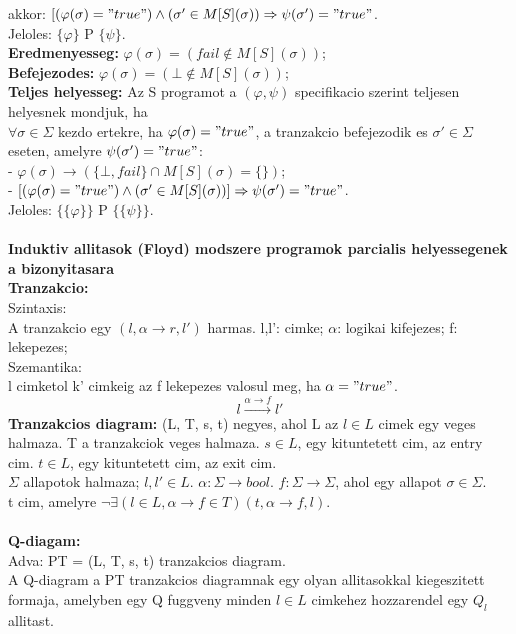 \documentclass[a4paper,10pt]{article}
\begin{document}
akkor: $[(\varphi(\sigma) = "true" ) \wedge (\sigma'\in M[S](\sigma)) \Rightarrow \psi(\sigma') = "true"$.\\
Jeloles: $\lbrace\varphi\rbrace$ P $\lbrace\psi\rbrace$.\\
\textbf{Eredmenyesseg:} $\varphi(\sigma) = (fail\not\in M[S](\sigma))$;\\
\textbf{Befejezodes:} $\varphi(\sigma) = (\bot\not\in M[S](\sigma))$;\\
\textbf{Teljes helyesseg:} Az S programot a $(\varphi, \psi)$ specifikacio szerint teljesen helyesnek mondjuk, ha\\
$\forall \sigma \in \Sigma$ kezdo ertekre, ha $\varphi(\sigma) = "true"$, a tranzakcio befejezodik es $\sigma'\in \Sigma$ eseten, amelyre $\psi(\sigma')="true"$:\\
- $\varphi(\sigma) \rightarrow (\lbrace\bot, fail\rbrace \cap M[S](\sigma)=\lbrace\rbrace)$;\\
- $[(\varphi(\sigma)="true")\wedge(\sigma'\in M[S](\sigma))] \Rightarrow \psi(\sigma') = "true"$.\\
Jeloles: $\lbrace\lbrace\varphi\rbrace\rbrace$ P $\lbrace\lbrace\psi\rbrace\rbrace$.\\\\
\textbf{Induktiv allitasok (Floyd) modszere programok parcialis helyessegenek a bizonyitasara}\\
\textbf{Tranzakcio:}\\
Szintaxis:\\
A tranzakcio egy $(l, \alpha\to r, l')$ harmas. l,l': cimke; $\alpha$: logikai kifejezes; f: lekepezes;\\
Szemantika:\\
l cimketol k' cimkeig az f lekepezes valosul meg, ha $\alpha="true"$.
$$l\xrightarrow{\alpha\to f}l'$$
\textbf{Tranzakcios diagram:} (L, T, s, t) negyes, ahol L az $l\in L$ cimek egy veges halmaza. T a tranzakciok veges halmaza. $s\in L$, egy kituntetett cim, az entry cim. $t\in L$, egy kituntetett cim, az exit cim.\\
$\Sigma$ allapotok halmaza; $l, l' \in L$. $\alpha: \Sigma \to bool$. $f: \Sigma \to \Sigma$, ahol egy allapot $\sigma \in \Sigma$.\\
t cim, amelyre $\neg\exists (l\in L, \alpha \to f\in T)(t, \alpha \to f, l)$.\\\\
\textbf{Q-diagam:}\\ Adva: PT = (L, T, s, t) tranzakcios diagram.\\
A Q-diagram a PT tranzakcios diagramnak egy olyan allitasokkal kiegeszitett formaja, amelyben egy Q fuggveny minden $l\in L$ cimkehez hozzarendel egy $Q_l$ allitast.\\ \\
\end{document}
